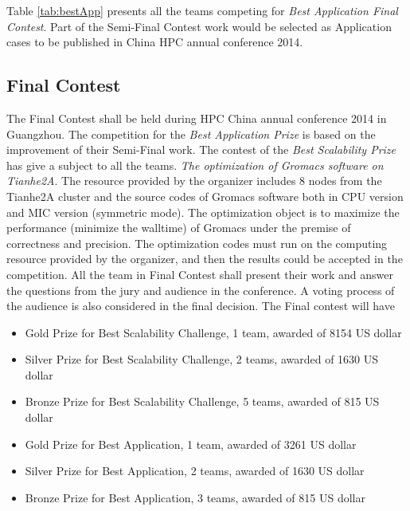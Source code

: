 Table \ref{tab:bestApp} presents all the teams competing for \textsl{Best Application Final Contest}. 
Part of the Semi-Final Contest work would be selected as Application cases to be published in China HPC annual conference 2014. 


\subsection{Final Contest} %
\label{sub:Final}
The Final Contest shall be held during HPC China annual conference 2014 in Guangzhou. The competition for the \textsl{Best Application 
Prize} is based on the improvement of their Semi-Final work. The contest of the \textsl{Best Scalability Prize} has give a subject to all 
the teams. \textsl{The optimization of Gromacs software on Tianhe2A}. The resource provided by the organizer includes 8 nodes from the 
Tianhe2A cluster and the source codes of Gromacs software both in CPU version and MIC version (symmetric mode).
The optimization object is to maximize the performance (minimize the walltime) of Gromacs under the premise of correctness and precision. 
The optimization codes must run on the computing resource provided by the organizer, and then the results could be accepted in the competition. 
All the team in Final Contest shall present their work and answer the questions from the jury and audience in the conference. A voting process of 
the audience is also considered in the final decision. 
The Final contest will have 
\begin{itemize}
	\item Gold Prize for Best Scalability Challenge, 1 team, awarded of 8154 US dollar
	\item Silver Prize for Best Scalability Challenge, 2 teams, awarded of 1630 US dollar
	\item Bronze Prize for Best Scalability Challenge, 5 teams, awarded of 815 US dollar
	\item Gold Prize for Best Application, 1 team, awarded of 3261 US dollar
	\item Silver Prize for Best Application, 2 teams, awarded of 1630 US dollar
	\item Bronze Prize for Best Application, 3 teams, awarded of 815 US dollar
\end{itemize}







